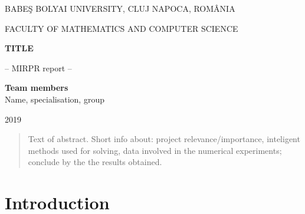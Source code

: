 \documentclass[runningheads,a4paper,11pt]{report}
\begin{document}
\begin{titlepage}
\sloppy
\begin{center}
BABE\c S BOLYAI UNIVERSITY, CLUJ NAPOCA, ROM\^ ANIA

FACULTY OF MATHEMATICS AND COMPUTER SCIENCE

\vspace{6cm}

\Huge \textbf{TITLE}

\vspace{1cm}

\normalsize -- MIRPR report --

\end{center}


\vspace{5cm}

\begin{flushright}
\Large{\textbf{Team members}}\\
Name, specialisation, group
\end{flushright}

\vspace{4cm}

\begin{center}
2019
\end{center}

\end{titlepage}


\begin{abstract}
	Text of abstract. Short info about: project relevance/importance, inteligent methods used for solving, data involved in the numerical experiments; conclude by the the results obtained.
\end{abstract}


\tableofcontents

\newpage

\listoftables
\listoffigures
\listofalgorithms

\newpage




\newpage



 


\chapter{Introduction}
\label{chapter:introduction}
\end{document}
